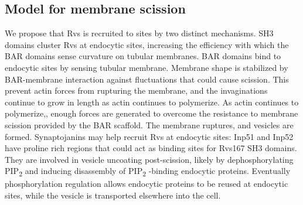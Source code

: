 \documentclass[9pt,lineno]{elife}
\begin{document}
\subsection{Model for membrane scission}
We propose that Rvs is recruited to sites by two distinct mechanisms. SH3 domains cluster Rvs at endocytic sites, increasing the efficiency with which the BAR domains sense curvature on tubular membranes. BAR domains bind to endocytic sites by sensing tubular membrane. Membrane shape is stabilized by BAR-membrane interaction against fluctuations that could cause scission. This prevent actin forces from rupturing the membrane, and the invaginations continue to grow in length as actin continues to polymerize. As actin continues to polymerize,, enough forces are generated to overcome the resistance to membrane scission provided by the BAR scaffold. The membrane ruptures, and vesicles are formed. Synaptojanins may help recruit Rvs at endocytic sites: Inp51 and Inp52 have proline rich regions that could act as binding sites for Rvs167 SH3 domains. They are involved in vesicle uncoating post-scission, likely by dephosphorylating PIP\textsubscript{2} and inducing disassembly of PIP\textsubscript{2} -binding endocytic proteins. Eventually phosphorylation regulation allows endocytic proteins to be reused at endocytic sites, while the vesicle is transported elsewhere into the cell. 


\end{document}
